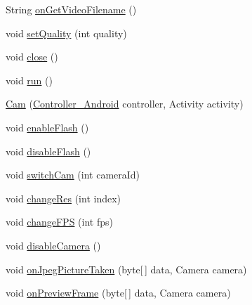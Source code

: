 \begin{DoxyCompactItemize}
\item 
String \hyperlink{classswp_1_1tuilmenau_1_1carduinodroid_1_1controller_1_1_cam_a75b628ee85543bcf0a65cacdaa740430}{on\+Get\+Video\+Filename} ()
\item 
void \hyperlink{classswp_1_1tuilmenau_1_1carduinodroid_1_1controller_1_1_cam_a06e60590e27bce234a6a7f1657f18fc0}{set\+Quality} (int quality)
\item 
void \hyperlink{classswp_1_1tuilmenau_1_1carduinodroid_1_1controller_1_1_cam_a690bbb9c9a4a7555c3e439f5b4e1399e}{close} ()
\item 
void \hyperlink{classswp_1_1tuilmenau_1_1carduinodroid_1_1controller_1_1_cam_ab8d692383962618c356c0d52327a348f}{run} ()
\item 
\hyperlink{classswp_1_1tuilmenau_1_1carduinodroid_1_1controller_1_1_cam_a8d39103ae69c076073e36459435c3e6b}{Cam} (\hyperlink{classswp_1_1tuilmenau_1_1carduinodroid_1_1controller_1_1_controller___android}{Controller\+\_\+\+Android} controller, Activity activity)
\item 
void \hyperlink{classswp_1_1tuilmenau_1_1carduinodroid_1_1controller_1_1_cam_a52096c4e16807a5338877c2249bfead5}{enable\+Flash} ()
\item 
void \hyperlink{classswp_1_1tuilmenau_1_1carduinodroid_1_1controller_1_1_cam_a043a28dda760fb66a89c670d97e70e60}{disable\+Flash} ()
\item 
void \hyperlink{classswp_1_1tuilmenau_1_1carduinodroid_1_1controller_1_1_cam_a7550a372448fb220d685acee511882f3}{switch\+Cam} (int camera\+Id)
\item 
void \hyperlink{classswp_1_1tuilmenau_1_1carduinodroid_1_1controller_1_1_cam_a14be40feed14460ce45a254bb9d5573d}{change\+Res} (int index)
\item 
void \hyperlink{classswp_1_1tuilmenau_1_1carduinodroid_1_1controller_1_1_cam_a935021c173d3d0a4e9d9cf1f0fc9253a}{change\+F\+P\+S} (int fps)
\item 
void \hyperlink{classswp_1_1tuilmenau_1_1carduinodroid_1_1controller_1_1_cam_a31a9a63c265425f1917dea93e722e49f}{disable\+Camera} ()
\item 
void \hyperlink{classswp_1_1tuilmenau_1_1carduinodroid_1_1controller_1_1_cam_a9d02cf28701a301ae81da9d826b6c6d6}{on\+Jpeg\+Picture\+Taken} (byte\mbox{[}$\,$\mbox{]} data, Camera camera)
\item 
void \hyperlink{classswp_1_1tuilmenau_1_1carduinodroid_1_1controller_1_1_cam_a36c84a09cf6164b9e80426a61a5ec860}{on\+Preview\+Frame} (byte\mbox{[}$\,$\mbox{]} data, Camera camera)
\item 

\end{DoxyCompactItemize}
